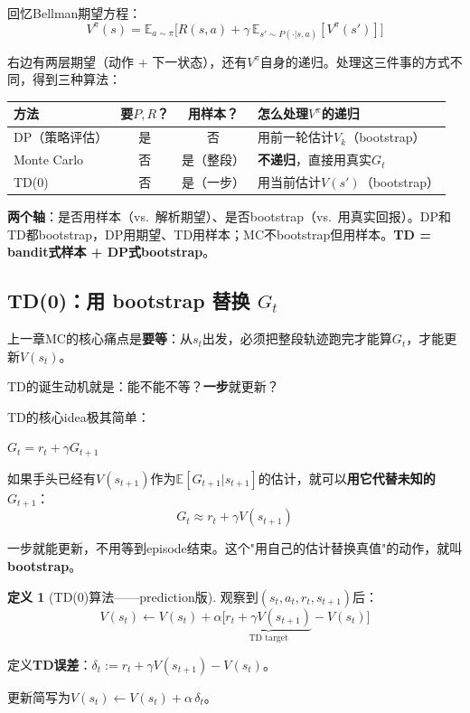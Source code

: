 \documentclass[11pt,a4paper]{article}
\theoremstyle{definition}
\newtheorem{definition}{定义}[section]
\begin{document}
\begin{keypoint}[估计$V^\pi$的三条路]
回忆Bellman期望方程：
\[
V^\pi(s) = \mathbb{E}_{a\sim\pi}\Big[R(s,a) + \gamma\, \mathbb{E}_{s'\sim P(\cdot|s,a)}[V^\pi(s')]\Big]
\]

右边有两层期望（动作 + 下一状态），还有$V^\pi$自身的递归。处理这三件事的方式不同，得到三种算法：

\begin{center}
\begin{tabular}{l|c|c|l}
\toprule
方法 & 要$P,R$？ & 用样本？ & 怎么处理$V^\pi$的递归 \\
\midrule
DP（策略评估） & 是 & 否 & 用前一轮估计$V_k$（bootstrap） \\
Monte Carlo & 否 & 是（整段） & \textbf{不递归}，直接用真实$G_t$ \\
TD(0) & 否 & 是（一步） & 用当前估计$V(s')$（bootstrap） \\
\bottomrule
\end{tabular}
\end{center}

\textbf{两个轴}：是否用样本（vs.\ 解析期望）、是否bootstrap（vs.\ 用真实回报）。DP和TD都bootstrap，DP用期望、TD用样本；MC不bootstrap但用样本。\textbf{TD = bandit式样本 + DP式bootstrap}。
\end{keypoint}

\subsection{TD(0)：用 bootstrap 替换 $G_t$}

\begin{plainwords}[回顾MC的痛点]
上一章MC的核心痛点是\textbf{要等}：从$s_t$出发，必须把整段轨迹跑完才能算$G_t$，才能更新$V(s_t)$。

TD的诞生动机就是：能不能不等？\textbf{一步}就更新？
\end{plainwords}

TD的核心idea极其简单：

\begin{intuition}[Return的递归关系]
$G_t = r_t + \gamma G_{t+1}$

如果手头已经有$V(s_{t+1})$作为$\mathbb{E}[G_{t+1}|s_{t+1}]$的估计，就可以\textbf{用它代替未知的$G_{t+1}$}：
\[
G_t \approx r_t + \gamma V(s_{t+1})
\]

一步就能更新，不用等到episode结束。这个"用自己的估计替换真值"的动作，就叫\textbf{bootstrap}。
\end{intuition}

\begin{definition}[TD(0)算法——prediction版]
观察到$(s_t, a_t, r_t, s_{t+1})$后：
\[
\boxed{V(s_t) \leftarrow V(s_t) + \alpha\Big[\underbrace{r_t + \gamma V(s_{t+1})}_{\text{TD target}} - V(s_t)\Big]}
\]

定义\textbf{TD误差}：$\delta_t := r_t + \gamma V(s_{t+1}) - V(s_t)$。

更新简写为$V(s_t) \leftarrow V(s_t) + \alpha\,\delta_t$。
\end{definition}
\end{document}
